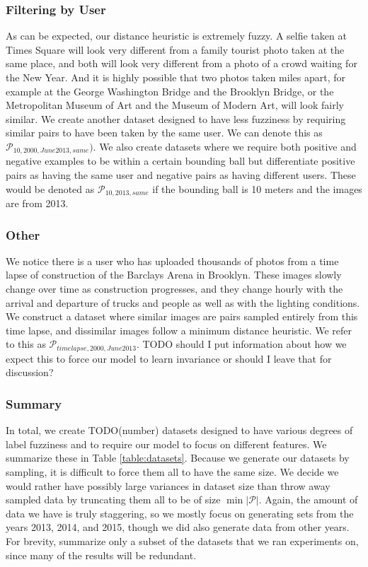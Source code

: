 \subsubsection{Filtering by User}
As can be expected, our distance heuristic is extremely fuzzy. A selfie taken at Times Square will look very different from a family tourist photo taken at the same place, and both will look very different from a photo of a crowd waiting for the New Year. And it is highly possible that two photos taken miles apart, for example at the George Washington Bridge and the Brooklyn Bridge, or the Metropolitan Museum of Art and the Museum of Modern Art, will look fairly similar. We create another dataset designed to have less fuzziness by requiring similar pairs to have been taken by the same user. We can denote this as $\mathcal{P}_{10,2000,June2013,same})$. We also create datasets where we require both positive and negative examples to be within a certain bounding ball but differentiate positive pairs as having the same user and negative pairs as having different users. These would be denoted as $\mathcal{P}_{10,2013,same}$ if the bounding ball is 10 meters and the images are from 2013. 

\subsubsection{Other}
We notice there is a user who has uploaded thousands of photos from a time lapse of construction of the Barclays Arena in Brooklyn. These images slowly change over time as construction progresses, and they change hourly with the arrival and departure of trucks and people as well as with the lighting conditions. We construct a dataset where similar images are pairs sampled entirely from this time lapse, and dissimilar images follow a minimum distance heuristic. We refer to this as $\mathcal{P}_{timelapse,2000,June2013}$. TODO should I put information about how we expect this to force our model to learn invariance or should I leave that for discussion?

\subsubsection{Summary}
In total, we create TODO(number) datasets designed to have various degrees of label fuzziness and to require our model to focus on different features. We summarize these in Table \ref{table:datasets}. Because we generate our datasets by sampling, it is difficult to force them all to have the same size. We decide we would rather have possibly large variances in dataset size than throw away sampled data by truncating them all to be of size $\min{|\mathcal{P}|}$. Again, the amount of data we have is truly staggering, so we mostly focus on generating sets from the years 2013, 2014, and 2015, though we did also generate data from other years. For brevity, summarize only a subset of the datasets that we ran experiments on, since many of the results will be redundant. 

